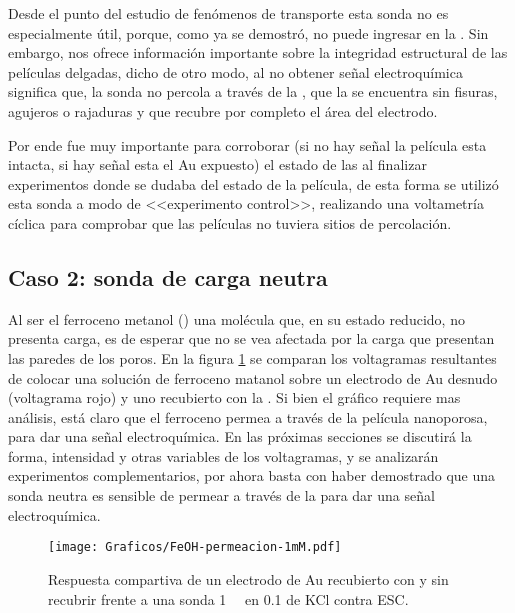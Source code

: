 	 Desde el punto del estudio de fenómenos de  transporte esta sonda no es especialmente útil, porque, como ya se demostró, no puede ingresar en la \pdm. Sin embargo, nos ofrece información importante sobre la integridad estructural de las películas delgadas, dicho de otro modo, al no obtener señal electroquímica significa que, la sonda no percola a través de la \pdm, que la \pdm\space se encuentra sin fisuras, agujeros o rajaduras y que recubre por completo el área del electrodo.

	 Por ende fue muy importante para corroborar (si no hay señal la película esta intacta, si hay señal esta el Au expuesto) el estado de las \pdm\space al finalizar experimentos donde se dudaba del estado de la película, de esta forma se utilizó esta sonda a modo de <<experimento control>>, realizando una voltametría cíclica para comprobar que las películas no tuviera sitios de percolación.

	\subsection{Caso 2: sonda de carga neutra}

		Al ser el ferroceno metanol (\fc) una molécula que, en su estado reducido, no presenta carga, es de esperar que no se vea afectada por la carga que presentan las paredes de los poros. En la figura \ref{fig:permeacion} se comparan los voltagramas resultantes de colocar una solución de ferroceno matanol sobre un electrodo de Au desnudo (voltagrama rojo) y uno recubierto con la \pdm.  Si bien el gráfico  requiere mas análisis, está claro que el ferroceno permea a través de la película nanoporosa, para dar una señal electroquímica. En las próximas secciones se discutirá la forma, intensidad y otras variables de los voltagramas, y se analizarán experimentos complementarios, por ahora basta con haber demostrado que una sonda neutra es sensible de permear a través de la \pdm\space para dar una señal electroquímica.

		\begin{figure}[ht]
				\centering
		 	    \texttt{[image: Graficos/FeOH-permeacion-1mM.pdf]}
		        \caption[Permeación ferroceno metanol]{Respuesta compartiva de un electrodo de Au recubierto con \pdmF\space y sin recubrir frente a una sonda \fc \SI{1}{\milli\Molar} en \SI{0.1}{\Molar} de KCl contra ESC.}
		        \label{fig:permeacion}
		      	\end{figure}

